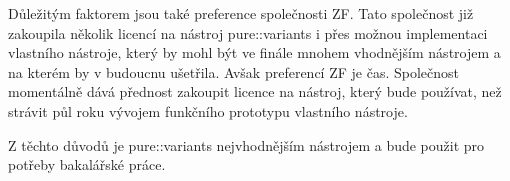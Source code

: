 Důležitým faktorem jsou také preference společnosti ZF. Tato společnost již zakoupila několik licencí na nástroj pure::variants i přes možnou implementaci vlastního nástroje, který by mohl být ve finále mnohem vhodnějším nástrojem a na kterém by v budoucnu ušetřila. Avšak preferencí ZF je čas. Společnost momentálně dává přednost zakoupit licence na nástroj, který bude používat, než strávit půl roku vývojem funkčního prototypu vlastního nástroje.

Z těchto důvodů je pure::variants nejvhodnějším nástrojem a bude použit pro potřeby bakalářské práce.

